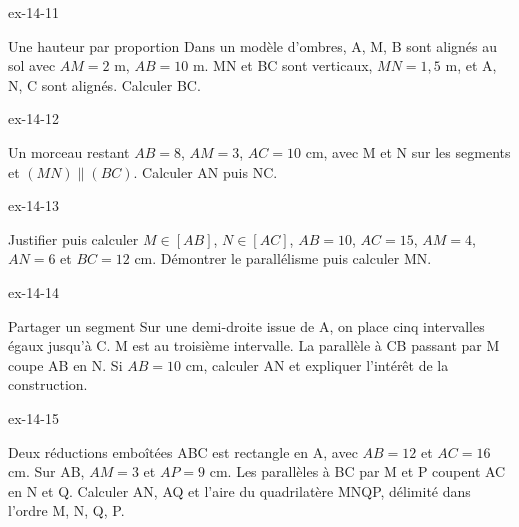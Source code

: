 \begin{blocLivre}{ex-14-11}\begin{exercice}[3]{Une hauteur par proportion}
Dans un modèle d’ombres, A, M, B sont alignés au sol avec $AM=2$ m, $AB=10$ m. MN et BC sont verticaux, $MN=1{,}5$ m, et A, N, C sont alignés. Calculer BC.
\label{fig-ex-14-11}
\end{exercice}\end{blocLivre}
\begin{blocLivre}{ex-14-12}\begin{exercice}[3]{Un morceau restant}
$AB=8$, $AM=3$, $AC=10$ cm, avec M et N sur les segments et $(MN)\parallel(BC)$. Calculer AN puis NC.
\label{fig-ex-14-12}
\end{exercice}\end{blocLivre}
\begin{blocLivre}{ex-14-13}\begin{exercice}[3]{Justifier puis calculer}
$M\in[AB]$, $N\in[AC]$, $AB=10$, $AC=15$, $AM=4$, $AN=6$ et $BC=12$ cm. Démontrer le parallélisme puis calculer MN.
\label{fig-ex-14-13}
\end{exercice}\end{blocLivre}
\begin{blocLivre}{ex-14-14}\begin{exercice}[3]{Partager un segment}
Sur une demi-droite issue de A, on place cinq intervalles égaux jusqu’à C. M est au troisième intervalle. La parallèle à CB passant par M coupe AB en N. Si $AB=10$ cm, calculer AN et expliquer l’intérêt de la construction.
\label{fig-ex-14-14}
\end{exercice}\end{blocLivre}
\begin{blocLivre}{ex-14-15}\begin{exercice}[3]{Deux réductions emboîtées}
ABC est rectangle en A, avec $AB=12$ et $AC=16$ cm. Sur AB, $AM=3$ et $AP=9$ cm. Les parallèles à BC par M et P coupent AC en N et Q. Calculer AN, AQ et l’aire du quadrilatère MNQP, délimité dans l’ordre M, N, Q, P.
\label{fig-ex-14-15}
\end{exercice}\end{blocLivre}

\clearpage
